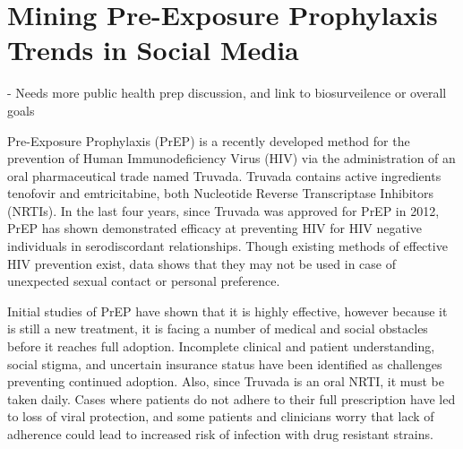 


%



\section{Mining Pre-Exposure Prophylaxis Trends in Social Media}

- Needs more public health prep discussion, and link to biosurveilence or overall goals

Pre-Exposure Prophylaxis (PrEP) is a recently developed method for the prevention of Human Immunodeficiency Virus (HIV) via the administration of an oral pharmaceutical trade named Truvada. Truvada contains active ingredients tenofovir and emtricitabine, both Nucleotide Reverse Transcriptase Inhibitors (NRTIs). In the last four years, since Truvada was approved for PrEP in 2012, PrEP has shown demonstrated efficacy at preventing HIV for HIV negative individuals in serodiscordant relationships\cite{liu2014early}. Though existing methods of effective HIV prevention exist, data shows that they may not be used in case of unexpected sexual contact or personal preference\cite{taylor2016life}. 

Initial studies of PrEP have shown that it is highly effective\cite{golub2013efficacy}, however because it is still a new treatment, it is facing a number of medical and social obstacles before it reaches full adoption. Incomplete clinical and patient understanding, social stigma, and uncertain insurance status have been identified as challenges preventing continued adoption\cite{calabrese2015stigma}. Also, since Truvada is an oral NRTI, it must be taken daily. Cases where patients do not adhere to their full prescription have led to loss of viral protection, and some patients and clinicians worry that lack of adherence could lead to increased risk of infection with drug resistant strains\cite{arnold2012qualitative}.

